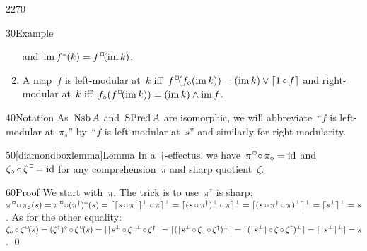 \begin{parsec}{2270}
\begin{point}{30}{Example}
\begin{enumerate}
        and~$\IM f^*(k) = f^\BOX (\IM k)$.
\item
    A map~$f$ is left-modular at~$k$
            iff~$f^\BOX (f_\diamond ( \IM k)) = 
                (\IM k) \vee \ceil{1 \after f}$
        and right-modular at~$k$
            iff~$f_\diamond (f^\BOX ( \IM k)) = 
                (\IM k) \wedge \IM f$.
\end{enumerate}
\begin{point}{40}{Notation}%
As~$\operatorname{Nsb} A$ and~$\operatorname{SPred} A$ are isomorphic,
    we will abbreviate~``$f$ is left-modular at~$\pi_s$''
    by~``$f$ is left-modular at~$s$''
    and similarly for right-modularity.
\end{point}
\end{point}
\begin{point}{50}[diamondboxlemma]{Lemma}%
In a~$\dagger$-effectus,
    we have~$\pi^\BOX \after \pi_\diamond = \id$
    and~$\zeta_\diamond \after \zeta^\BOX = \id$
    for any comprehension~$\pi$
    and sharp quotient~$\zeta$.
\begin{point}{60}{Proof}%
We start with~$\pi$.  The trick is to use~$\pi^\dagger$ is sharp:
    $\pi^\BOX \after \pi_\diamond (s) =
    \pi^\BOX \after (\pi^\dagger)^\diamond (s) =
    \lceil \lceil s \after \pi^\dagger \rceil^\perp \after \pi\rceil^\perp =
    \lceil(s \after \pi^\dagger)^\perp \after \pi\rceil^\perp =
    \lceil(s \after \pi^\dagger \after \pi)^\perp\rceil^\perp =
    \lceil s ^\perp\rceil^\perp = s $.
As for the other equality:
    $\zeta_\diamond \after \zeta^\BOX (s)
        = (\zeta^\dagger)^\diamond \after \zeta^\BOX (s)
        = \lceil\lceil s^\perp \after  \zeta \rceil^\perp \after \zeta^\dagger\rceil
        = \lceil(\lceil s^\perp \after  \zeta \rceil \after \zeta^\dagger)^\perp\rceil
        = \lceil(\lceil s^\perp\rceil \after \zeta \after \zeta^\dagger)^\perp\rceil
        = \lceil \lceil s^\perp\rceil^\perp \rceil = s $. \qed
\end{point}
\end{point}
\end{parsec}
